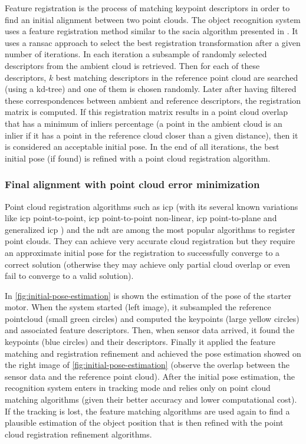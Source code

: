 Feature registration is the process of matching keypoint descriptors in order to find an initial alignment between two point clouds. The object recognition system uses a feature registration method similar to the \gls{sacia} algorithm presented in \cite{Rusu2009}. It uses a \gls{ransac} approach to select the best registration transformation after a given number of iterations. In each iteration a subsample of randomly selected descriptors from the ambient cloud is retrieved. Then for each of these descriptors, $k$ best matching descriptors in the reference point cloud are searched (using a kd-tree) and one of them is chosen randomly. Later after having filtered these correspondences between ambient and reference descriptors, the registration matrix is computed. If this registration matrix results in a point cloud overlap that has a minimum of inliers percentage (a point in the ambient cloud is an inlier if it has a point in the reference cloud closer than a given distance), then it is considered an acceptable initial pose. In the end of all iterations, the best initial pose (if found) is refined with a point cloud registration algorithm.


\subsubsection{Final alignment with point cloud error minimization}

Point cloud registration algorithms such as \gls{icp} \cite{Besl1992} (with its several known variations \cite{Rusinkiewicz2001,Pomerleau2013} like \gls{icp} point-to-point, \gls{icp} point-to-point non-linear, \gls{icp} point-to-plane and generalized \gls{icp} \cite{Segal2009}) and the \gls{ndt} \cite{Magnusson2009} are among the most popular algorithms to register point clouds. They can achieve very accurate cloud registration but they require an approximate initial pose for the registration to successfully converge to a correct solution (otherwise they may achieve only partial cloud overlap or even fail to converge to a valid solution).

In \cref{fig:initial-pose-estimation} is shown the estimation of the pose of the starter motor. When the system started (left image), it subsampled the reference pointcloud (small green circles) and computed the keypoints (large yellow circles) and associated feature descriptors. Then, when sensor data arrived, it found the keypoints (blue circles) and their descriptors. Finally it applied the feature matching and registration refinement and achieved the pose estimation showed on the right image of \cref{fig:initial-pose-estimation} (observe the overlap between the sensor data and the reference point cloud). After the initial pose estimation, the recognition system enters in tracking mode and relies only on point cloud matching algorithms (given their better accuracy and lower computational cost). If the tracking is lost, the feature matching algorithms are used again to find a plausible estimation of the object position that is then refined with the point cloud registration refinement algorithms.

